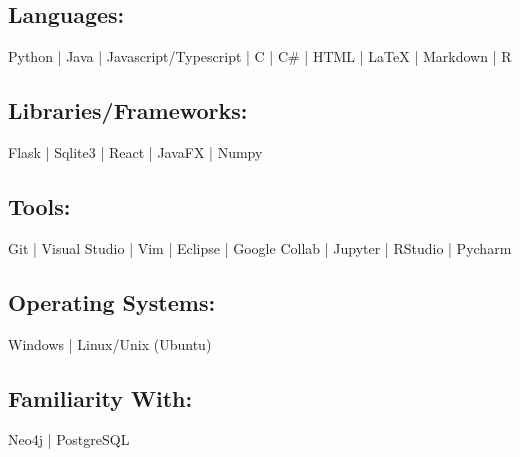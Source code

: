 \documentclass[10pt]{article}
\begin{document}
\subsection{Languages:}
Python | Java | Javascript/Typescript | C | C\# | HTML | LaTeX | Markdown | R
\subsection{Libraries/Frameworks:}
Flask | Sqlite3 | React | JavaFX | Numpy
\subsection{Tools:}
Git | Visual Studio | Vim | Eclipse | Google Collab | Jupyter | RStudio | Pycharm
\subsection{Operating Systems:}
Windows | Linux/Unix (Ubuntu)

\subsection{Familiarity With:}
Neo4j | PostgreSQL
\end{document}

